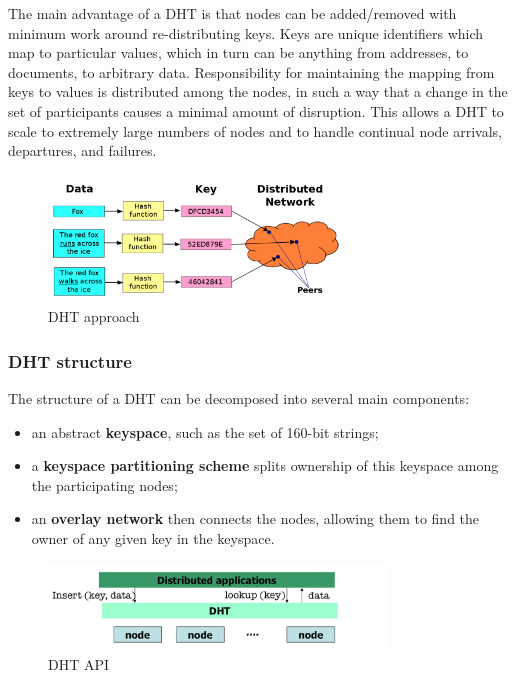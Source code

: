 \documentclass[a4paper,12pt]{article}
\begin{document}
The main advantage of a DHT is that nodes can be added/removed with minimum work around re-distributing keys. Keys are unique identifiers which map to particular values, which in turn can be anything from addresses, to documents, to arbitrary data. Responsibility for maintaining the mapping from keys to values is distributed among the nodes, in such a way that a change in the set of participants causes a minimal amount of disruption. This allows a DHT to scale to extremely large numbers of nodes and to handle continual node arrivals, departures, and failures.

\begin{figure}[t]
  \centering
  \includegraphics[width=0.7\textwidth]{img/dht}
  \caption{\label{fig:dht} DHT approach}
\end{figure}

\subsubsection{DHT structure}

The structure of a DHT can be decomposed into several main components:
\begin{itemize}
  \item an abstract \textbf{keyspace}, such as the set of 160-bit strings;
  \item a \textbf{keyspace partitioning scheme} splits ownership of this keyspace among the participating nodes;
  \item an \textbf{overlay network} then connects the nodes, allowing them to find the owner of any given key in the keyspace.
\end{itemize}

\begin{figure}[b!]
  \centering
  \includegraphics[width=0.8\textwidth]{img/dht-api}
  \caption{\label{fig:dht-api} DHT API}
\end{figure}
\end{document}

